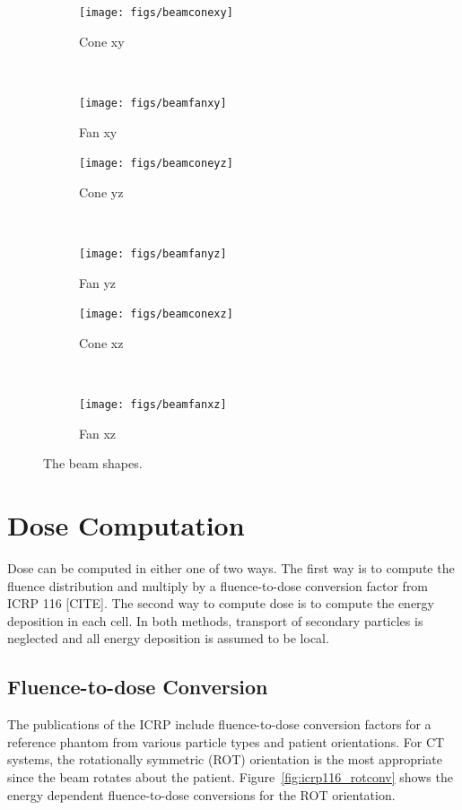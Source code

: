 \begin{figure}
    \centering
    \begin{subfigure}[b]{0.45\textwidth}
        \texttt{[image: figs/beamconexy]}
        \caption{Cone xy}
        \label{fig:beamconexy}
    \end{subfigure}
    ~
    \begin{subfigure}[b]{0.45\textwidth}
        \texttt{[image: figs/beamfanxy]}
        \caption{Fan xy}
        \label{fig:beamfanxy}
    \end{subfigure}

    \begin{subfigure}[b]{0.45\textwidth}
        \texttt{[image: figs/beamconeyz]}
        \caption{Cone yz}
        \label{fig:beamconeyz}
    \end{subfigure}
    ~
    \begin{subfigure}[b]{0.45\textwidth}
        \texttt{[image: figs/beamfanyz]}
        \caption{Fan yz}
        \label{fig:beamfanyz}
    \end{subfigure}
    
    \begin{subfigure}[b]{0.45\textwidth}
        \texttt{[image: figs/beamconexz]}
        \caption{Cone xz}
        \label{fig:beamconexz}
    \end{subfigure}
    ~
    \begin{subfigure}[b]{0.45\textwidth}
        \texttt{[image: figs/beamfanxz]}
        \caption{Fan xz}
        \label{fig:beamfanxz}
    \end{subfigure}
    \caption{The beam shapes.}\label{fig:beamfancone}
\end{figure}

\section{Dose Computation}
Dose can be computed in either one of two ways. The first way is to compute the fluence distribution and multiply by a fluence-to-dose conversion factor from ICRP 116 [CITE]. The second way to compute dose is to compute the energy deposition in each cell. In both methods, transport of secondary particles is neglected and all energy deposition is assumed to be local.

\subsection{Fluence-to-dose Conversion}

The publications of the ICRP include fluence-to-dose conversion factors for a reference phantom from various particle types and patient orientations. For CT systems, the rotationally symmetric (ROT) orientation is the most appropriate since the beam rotates about the patient. Figure~\ref{fig:icrp116_rotconv} shows the energy dependent fluence-to-dose conversions for the ROT orientation.

